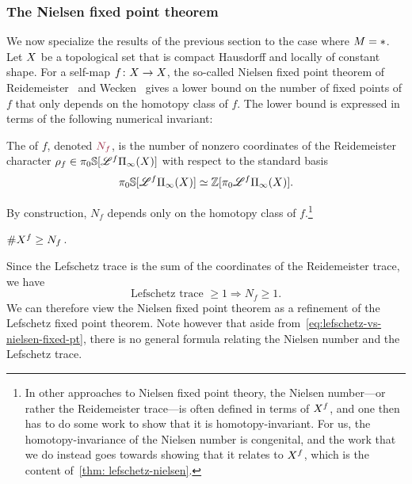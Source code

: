 \subsubsection{The Nielsen fixed point theorem}\label{subsec:classical-nielsen}
We now specialize the results of the previous section to the case
where $M = \ast$. 
Let $X$ be a topological set that is compact Hausdorff and locally of constant shape. For a self-map $f\colon X\to X$, the so-called Nielsen fixed point theorem of Reidemeister~\cite{Reidemeister1936} and Wecken~\cite{Wecken1941a,Wecken1941b,Wecken1942} gives a lower bound on the number of fixed points of $f$ that only depends on the homotopy class of $f$. The lower bound is expressed in terms of the following numerical invariant:
\begin{defn}\label{defn: Nielsen number}
  The  of $f$, denoted $\mdef{N_f}$, is the number of nonzero coordinates of the Reidemeister character $\rho_f\in\pi_0\SS\lbrack\cL^f\ani{\tset}\rbrack$ with respect to the standard basis
  \begin{equation}
    \label{eq:standard-basis-of-reidemeister-target}
    \pi_0\SS\lbrack\cL^f\ani{\tset}\rbrack\simeq\ZZ\lbrack\pi_0\cL^f\ani{\tset}\rbrack.
  \end{equation}
\end{defn}
By construction, $N_f$ depends only on the homotopy class of $f$.\footnote{In other approaches to Nielsen fixed point theory, the Nielsen number---or rather the Reidemeister trace---is often defined in terms of $X^f$, and one then has to do some work to show that it is homotopy-invariant. For us, the homotopy-invariance of the Nielsen number is congenital, and the work that we do instead goes towards showing that it relates to $X^f$, which is the content of~\cref{thm: lefschetz-nielsen}.}
\begin{prop}
  $\#X^f \geq N_f\,$.
\end{prop}
Since the Lefschetz trace is the sum of the coordinates of the Reidemeister trace, we have
\begin{equation}
  \label{eq:lefschetz-vs-nielsen-fixed-pt}
  \text{Lefschetz trace }\geq 1\Rightarrow N_f\geq 1.
\end{equation}
We can therefore view the Nielsen fixed point theorem as a refinement of the Lefschetz fixed point theorem. Note however that aside from~\eqref{eq:lefschetz-vs-nielsen-fixed-pt}, there is no general formula relating the Nielsen number and the Lefschetz trace.
